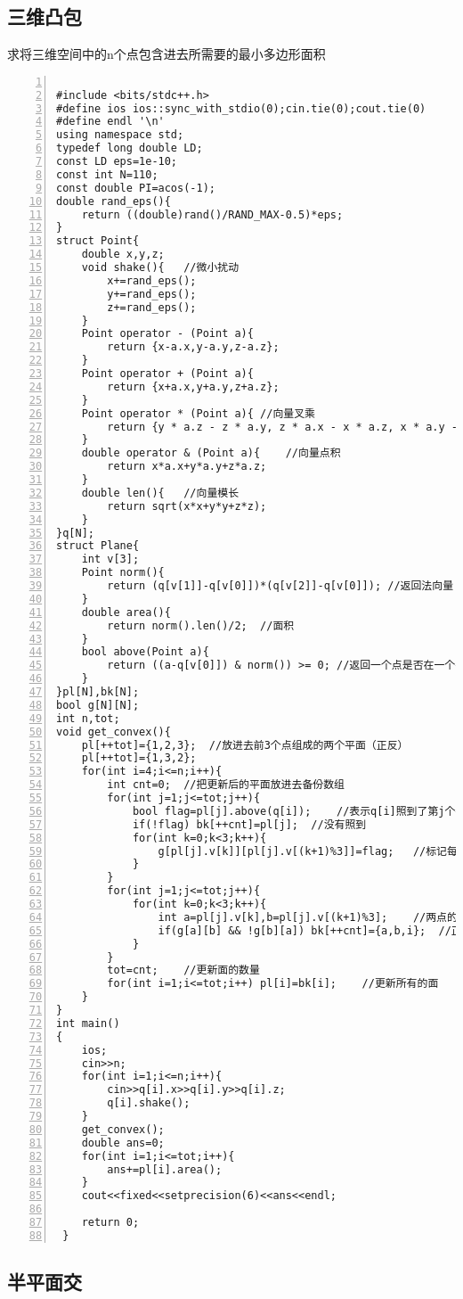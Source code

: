\subsection{三维凸包}

求将三维空间中的n个点包含进去所需要的最小多边形面积
\begin{lstlisting}[language={[ANSI]C},numbers=left]

#include <bits/stdc++.h>
#define ios ios::sync_with_stdio(0);cin.tie(0);cout.tie(0)
#define endl '\n'
using namespace std;
typedef long double LD;
const LD eps=1e-10;
const int N=110;
const double PI=acos(-1);
double rand_eps(){
	return ((double)rand()/RAND_MAX-0.5)*eps;
}
struct Point{
	double x,y,z;
	void shake(){	//微小扰动
		x+=rand_eps();
		y+=rand_eps();
		z+=rand_eps();
	}
	Point operator - (Point a){
		return {x-a.x,y-a.y,z-a.z};
	}
	Point operator + (Point a){
		return {x+a.x,y+a.y,z+a.z};
	}
	Point operator * (Point a){	//向量叉乘
		return {y * a.z - z * a.y, z * a.x - x * a.z, x * a.y - y * a.x};
	}
	double operator & (Point a){	//向量点积
		return x*a.x+y*a.y+z*a.z;
	}
	double len(){	//向量模长
		return sqrt(x*x+y*y+z*z);
	}
}q[N];
struct Plane{
	int v[3];
	Point norm(){
		return (q[v[1]]-q[v[0]])*(q[v[2]]-q[v[0]]);	//返回法向量
	}
	double area(){
		return norm().len()/2;	//面积
	}
	bool above(Point a){
		return ((a-q[v[0]]) & norm()) >= 0;	//返回一个点是否在一个平面上方，也就是平面能不能被照到
	}
}pl[N],bk[N];
bool g[N][N];
int n,tot;
void get_convex(){
	pl[++tot]={1,2,3};	//放进去前3个点组成的两个平面（正反）
	pl[++tot]={1,3,2};
	for(int i=4;i<=n;i++){
		int cnt=0;	//把更新后的平面放进去备份数组
		for(int j=1;j<=tot;j++){
			bool flag=pl[j].above(q[i]);	//表示q[i]照到了第j个平面
			if(!flag) bk[++cnt]=pl[j];	//没有照到
			for(int k=0;k<3;k++){
				g[pl[j].v[k]][pl[j].v[(k+1)%3]]=flag;	//标记每一条边是否照到
			}
		}
		for(int j=1;j<=tot;j++){
			for(int k=0;k<3;k++){
				int a=pl[j].v[k],b=pl[j].v[(k+1)%3];	//两点的编号
				if(g[a][b] && !g[b][a]) bk[++cnt]={a,b,i};	//正着可以照到，反着照不到，把照到的边扔掉
			}
		}
		tot=cnt;	//更新面的数量
		for(int i=1;i<=tot;i++) pl[i]=bk[i];	//更新所有的面
	}
}
int main()
{
	ios;
	cin>>n;
	for(int i=1;i<=n;i++){
		cin>>q[i].x>>q[i].y>>q[i].z;
		q[i].shake();
	}
	get_convex();
	double ans=0;
	for(int i=1;i<=tot;i++){
		ans+=pl[i].area();
	}
	cout<<fixed<<setprecision(6)<<ans<<endl;
	
	return 0;
 } 
\end{lstlisting}

\subsection{半平面交}


